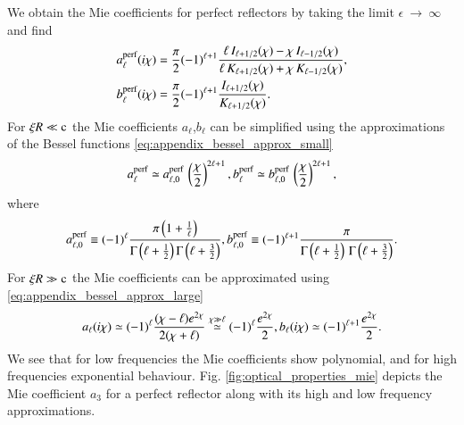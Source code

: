 We obtain the Mie coefficients for perfect reflectors by taking the limit
$\epsilon~\to~\infty$ and find
\begin{align}
a_\ell^\text{perf}(i\chi) &= \frac{\pi}{2} (-1)^{\ell+1} \frac{ \ell\,I_{\ell+1/2}(\chi) - \chi\,I_{\ell-1/2}(\chi) }{ \ell\,K_{\ell+1/2}(\chi) + \chi\,K_{\ell-1/2}(\chi) }, \\
b_\ell^\text{perf}(i\chi) &= \frac{\pi}{2} (-1)^{\ell+1} \frac{ I_{\ell+1/2}(\chi)}{ K_{\ell+1/2}(\chi) }.
\end{align}
For $\xi R \ll \mathrm{c}$ the Mie coefficients $a_\ell$,$b_\ell$ can be simplified
using the approximations of the Bessel functions \eqref{eq:appendix_bessel_approx_small}
\begin{equation}
\label{eq:scattering_ps_mie_approx}
a_\ell^\text{perf} \simeq a_{\ell,0}^\text{perf} \, \left(\frac{\chi}{2}\right)^{2\ell+1}, \\
b_\ell^\text{perf} \simeq b_{\ell,0}^\text{perf} \, \left(\frac{\chi}{2}\right)^{2\ell+1},
\end{equation}
where
\begin{equation}
\label{eq:scattering_ps_mie_prefactors}
a_{\ell,0}^\text{perf} \equiv (-1)^{\ell}   \frac{\pi\left( 1 + \frac{1}{\ell}\right)}{\Gamma\left(\ell+\frac{1}{2}\right) \Gamma\left(\ell+\frac{3}{2}\right)}, \\
b_{\ell,0}^\text{perf} \equiv (-1)^{\ell+1} \frac{\pi}{\Gamma\left(\ell+\frac{1}{2}\right)\,\Gamma\left(\ell+\frac{3}{2}\right)}.
\end{equation}
For $\xi R \gg \mathrm{c}$ the Mie coefficients can be approximated
using \eqref{eq:appendix_bessel_approx_large}
\begin{equation}
\label{eq:optical_properties_mie_large}
a_\ell(i\chi) \simeq (-1)^\ell \frac{(\chi-\ell)e^{2\chi}}{2(\chi+\ell)} \overset{\chi\gg\ell}{\simeq} (-1)^\ell \frac{e^{2\chi}}{2}, \\
b_\ell(i\chi) \simeq (-1)^{\ell+1} \frac{e^{2\chi}}{2}.
\end{equation}
We see that for low frequencies the Mie coefficients show polynomial, and for
high frequencies exponential behaviour. Fig. \ref{fig:optical_properties_mie}
depicts the Mie coefficient $a_3$ for a perfect reflector along with its high
and low frequency approximations.

